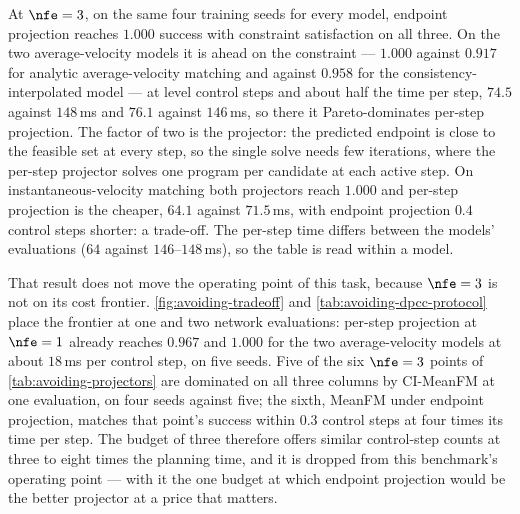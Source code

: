 At $\nfe=3$, on the same four training seeds for every model, endpoint projection reaches $1.000$ success
with constraint satisfaction on all three. On the two average-velocity models it is ahead on the
constraint --- $1.000$ against $0.917$ for analytic average-velocity matching and against $0.958$ for the
consistency-interpolated model --- at level control steps and about half the time per step, $74.5$ against
$148$\,ms and $76.1$ against $146$\,ms, so there it Pareto-dominates per-step projection. The factor of two
is the projector: the predicted endpoint is close to the feasible set at every step, so the single solve
needs few iterations, where the per-step projector solves one program per candidate at each active step.
On instantaneous-velocity matching both projectors reach $1.000$ and per-step projection is the cheaper,
$64.1$ against $71.5$\,ms, with endpoint projection $0.4$ control steps shorter: a trade-off. The per-step
time differs between the models' evaluations ($64$ against $146$--$148$\,ms), so the table is read within
a model.

That result does not move the operating point of this task, because $\nfe=3$ is not on its cost frontier.
\autoref{fig:avoiding-tradeoff} and \autoref{tab:avoiding-dpcc-protocol} place the frontier at one and
two network evaluations: per-step projection at $\nfe=1$ already reaches $0.967$ and $1.000$ for the two
average-velocity models at about $18$\,ms per control step, on five seeds. Five of the six $\nfe=3$ points of
\autoref{tab:avoiding-projectors} are dominated on all three columns by CI-MeanFM at one evaluation, on four
seeds against five; the sixth, MeanFM under endpoint projection, matches that point's success within $0.3$
control steps at four times its time per step. The budget of three therefore offers similar control-step
counts at three to eight times the planning time, and it is dropped from this benchmark's operating point
--- with it the one budget at which endpoint projection would be the better projector at a price that
matters.

